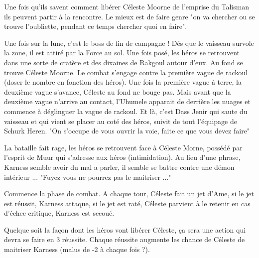 Une fois qu'ils savent comment libérer Céleste Moorne de l'emprise du Talisman ils peuvent partir à la rencontre. Le mieux est de faire genre "on va chercher ou se trouve l'oubliette, pendant ce temps chercher quoi en faire".


Une fois sur la lune, c'est le boss de fin de campagne !
Dés que le vaisseau survole la zone, il est attiré par la Force au sol. Une fois posé, les héros se retrouvent dans une sorte de cratère et des dixaines de Rakgoul autour d'eux. Au fond se trouve Céleste Moorne. Le combat s'engage contre la première vague de rackoul (doser le nombre en fonction des héros). Une fois la première vague à terre, la deuxième vague s'avance, Céleste au fond ne bouge pas.
Mais avant que la deuxième vague n'arrive au contact, l'Uhumele apparait de derrière les nuages et commence à déglinguer la vague de rackoul. Et là, c'est Dass Jenir qui saute du vaisseau et qui vient se placer au coté des héros, suivit de tout l'équipage de Schurk Heren. "On s'occupe de vous ouvrir la voie, faite ce que vous devez faire"

La bataille fait rage, les héros se retrouvent face à Céleste Morne, possédé par l'esprit de Muur qui s'adresse aux héros (intimidation). Au lieu d'une phrase, Karness semble avoir du mal a parler, il semble se battre contre une démon intérieur ... "Fuyez vous ne pourrez pas le maitriser ..."

Commence la phase de combat. A chaque tour, Céleste fait un jet d'Ame, si le jet est réussit, Karness attaque, si le jet est raté, Céleste parvient à le retenir en cas d'échec critique, Karness est secoué.

Quelque soit la façon dont les héros vont libérer Céleste, ça sera une action qui devra se faire en 3 réussite. Chaque réussite augmente les chance de Céleste de maitriser Karness (malus de -2 à chaque fois ?). 